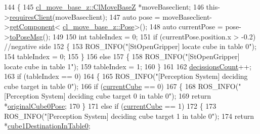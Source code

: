 \begin{DoxyCode}
144     \{
145         \hyperlink{classcl__move__base__z_1_1ClMoveBaseZ}{cl\_move\_base\_z::ClMoveBaseZ} *moveBaseclient;
146         this->\hyperlink{classsmacc_1_1ISmaccClient_a7a9990a2f3e35d547671188d69fee520}{requiresClient}(moveBaseclient);
147         \textcolor{keyword}{auto} pose = moveBaseclient->\hyperlink{classsmacc_1_1ISmaccClient_adef78db601749ca63c19e74a27cb88cc}{getComponent}<
      \hyperlink{classcl__move__base__z_1_1Pose}{cl\_move\_base\_z::Pose}>();
148         \textcolor{keyword}{auto} currentPose = pose->\hyperlink{classcl__move__base__z_1_1Pose_a9faf8c6b437ff6b19c8bddd692908dca}{toPoseMsg}();
149 
150         \textcolor{keywordtype}{int} tableIndex = 0;
151         \textcolor{keywordflow}{if} (currentPose.position.x > -0.2) \textcolor{comment}{//negative side}
152         \{
153             ROS\_INFO(\textcolor{stringliteral}{"[StOpenGripper] locate cube in table 0"});
154             tableIndex = 0;
155         \}
156         \textcolor{keywordflow}{else}
157         \{
158             ROS\_INFO(\textcolor{stringliteral}{"[StOpenGripper] locate cube in table 1"});
159             tableIndex = 1;
160         \}
161 
162         \hyperlink{classsm__fetch__two__table__pick__n__place__1_1_1cl__perception__system_1_1ClPerceptionSystem_a3639b112c2051d9d5f15716c8a72f127}{decissionsCount}++;
163         \textcolor{keywordflow}{if} (tableIndex == 0)
164         \{
165             ROS\_INFO(\textcolor{stringliteral}{"[Perception System] deciding cube target in table 0"});
166             \textcolor{keywordflow}{if} (\hyperlink{classsm__fetch__two__table__pick__n__place__1_1_1cl__perception__system_1_1ClPerceptionSystem_a0acc9100f7de93d128c356fe928f311a}{currentCube} == 0)
167             \{
168                 ROS\_INFO(\textcolor{stringliteral}{"[Perception System] deciding cube target 0 in table 0"});
169                 \textcolor{keywordflow}{return} *\hyperlink{classsm__fetch__two__table__pick__n__place__1_1_1cl__perception__system_1_1ClPerceptionSystem_a9a81fba6b953fba9b27e0a2f222290d0}{originalCube0Pose};
170             \}
171             \textcolor{keywordflow}{else} \textcolor{keywordflow}{if} (\hyperlink{classsm__fetch__two__table__pick__n__place__1_1_1cl__perception__system_1_1ClPerceptionSystem_a0acc9100f7de93d128c356fe928f311a}{currentCube} == 1)
172             \{
173                 ROS\_INFO(\textcolor{stringliteral}{"[Perception System] deciding cube target 1 in table 0"});
174                 \textcolor{keywordflow}{return} *\hyperlink{classsm__fetch__two__table__pick__n__place__1_1_1cl__perception__system_1_1ClPerceptionSystem_a06728bf2c7c0f56c02e485b46fbc0c93}{cube1DestinationInTable0};

\end{DoxyCode}
